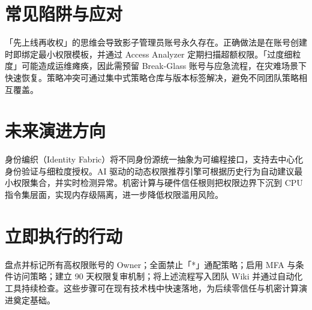 \chapter{常见陷阱与应对}
「先上线再收权」的思维会导致影子管理员账号永久存在。正确做法是在账号创建时即绑定最小权限模板，并通过 Access Analyzer 定期扫描超额权限。「过度细粒度」可能造成运维瘫痪，因此需预留 Break-Glass 账号与应急流程，在灾难场景下快速恢复。策略冲突可通过集中式策略仓库与版本标签解决，避免不同团队策略相互覆盖。\par
\chapter{未来演进方向}
身份编织（Identity Fabric）将不同身份源统一抽象为可编程接口，支持去中心化身份验证与细粒度授权。AI 驱动的动态权限推荐引擎可根据历史行为自动建议最小权限集合，并实时检测异常。机密计算与硬件信任根则把权限边界下沉到 CPU 指令集层面，实现内存级隔离，进一步降低权限滥用风险。\par
\chapter{立即执行的行动}
盘点并标记所有高权限账号的 Owner；全面禁止「*」通配策略；启用 MFA 与条件访问策略；建立 90 天权限复审机制；将上述流程写入团队 Wiki 并通过自动化工具持续检查。这些步骤可在现有技术栈中快速落地，为后续零信任与机密计算演进奠定基础。\par
